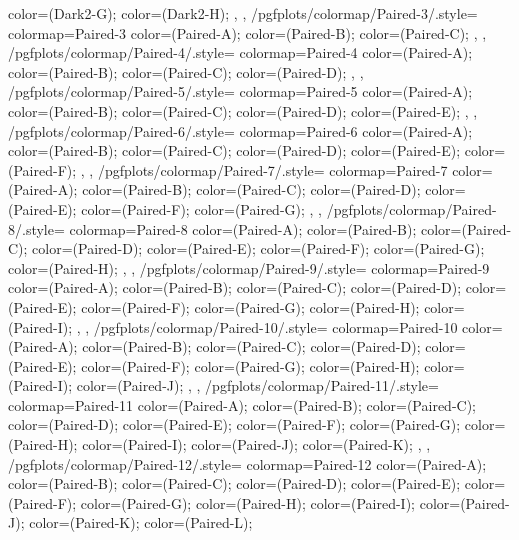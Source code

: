 {{{      color=(Dark2-G);
      color=(Dark2-H);
    },
  },
  /pgfplots/colormap/Paired-3/.style={
    colormap={Paired-3}{
      color=(Paired-A);
      color=(Paired-B);
      color=(Paired-C);
    },
  },
  /pgfplots/colormap/Paired-4/.style={
    colormap={Paired-4}{
      color=(Paired-A);
      color=(Paired-B);
      color=(Paired-C);
      color=(Paired-D);
    },
  },
  /pgfplots/colormap/Paired-5/.style={
    colormap={Paired-5}{
      color=(Paired-A);
      color=(Paired-B);
      color=(Paired-C);
      color=(Paired-D);
      color=(Paired-E);
    },
  },
  /pgfplots/colormap/Paired-6/.style={
    colormap={Paired-6}{
      color=(Paired-A);
      color=(Paired-B);
      color=(Paired-C);
      color=(Paired-D);
      color=(Paired-E);
      color=(Paired-F);
    },
  },
  /pgfplots/colormap/Paired-7/.style={
    colormap={Paired-7}{
      color=(Paired-A);
      color=(Paired-B);
      color=(Paired-C);
      color=(Paired-D);
      color=(Paired-E);
      color=(Paired-F);
      color=(Paired-G);
    },
  },
  /pgfplots/colormap/Paired-8/.style={
    colormap={Paired-8}{
      color=(Paired-A);
      color=(Paired-B);
      color=(Paired-C);
      color=(Paired-D);
      color=(Paired-E);
      color=(Paired-F);
      color=(Paired-G);
      color=(Paired-H);
    },
  },
  /pgfplots/colormap/Paired-9/.style={
    colormap={Paired-9}{
      color=(Paired-A);
      color=(Paired-B);
      color=(Paired-C);
      color=(Paired-D);
      color=(Paired-E);
      color=(Paired-F);
      color=(Paired-G);
      color=(Paired-H);
      color=(Paired-I);
    },
  },
  /pgfplots/colormap/Paired-10/.style={
    colormap={Paired-10}{
      color=(Paired-A);
      color=(Paired-B);
      color=(Paired-C);
      color=(Paired-D);
      color=(Paired-E);
      color=(Paired-F);
      color=(Paired-G);
      color=(Paired-H);
      color=(Paired-I);
      color=(Paired-J);
    },
  },
  /pgfplots/colormap/Paired-11/.style={
    colormap={Paired-11}{
      color=(Paired-A);
      color=(Paired-B);
      color=(Paired-C);
      color=(Paired-D);
      color=(Paired-E);
      color=(Paired-F);
      color=(Paired-G);
      color=(Paired-H);
      color=(Paired-I);
      color=(Paired-J);
      color=(Paired-K);
    },
  },
  /pgfplots/colormap/Paired-12/.style={
    colormap={Paired-12}{
      color=(Paired-A);
      color=(Paired-B);
      color=(Paired-C);
      color=(Paired-D);
      color=(Paired-E);
      color=(Paired-F);
      color=(Paired-G);
      color=(Paired-H);
      color=(Paired-I);
      color=(Paired-J);
      color=(Paired-K);
      color=(Paired-L);
}}}
